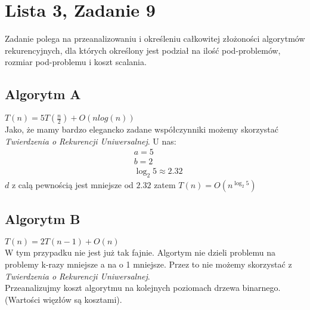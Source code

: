 \documentclass{article}
\begin{document}
\section{Lista 3, Zadanie 9}
Zadanie polega na przeanalizowaniu i określeniu całkowitej złożoności algorytmów rekurencyjnych, dla których określony jest podział na ilość pod-problemów, rozmiar pod-problemu i koszt scalania.

\subsection{Algorytm A}
$T(n) = 5T(\frac{n}{2}) + O(nlog(n))$\\

Jako, że mamy bardzo elegancko zadane współczynniki możemy skorzystać \textit{Twierdzenia o Rekurencji Uniwersalnej}.
U nas: 
\begin{align*}
	&a = 5\\
	&b = 2\\
	&\log_2 5 \approx 2.32
\end{align*}
$d$ z calą pewnością jest mniejsze od $2.32$ zatem $T(n) = O(n^{\log_2 5})$

\subsection{Algorytm B}
$T(n) = 2T(n-1)+ O(n)$\\

W tym przypadku nie jest już tak fajnie. Algortym nie dzieli problemu na problemy k-razy mniejsze a na o 1 mniejsze. Przez to nie możemy skorzystać z \textit{Twierdzenia o Rekurencji Uniwersalnej}.\\
Przeanalizujmy koszt algorytmu na kolejnych poziomach drzewa binarnego. (Wartości więzłów są kosztami).\\

\end{document}
